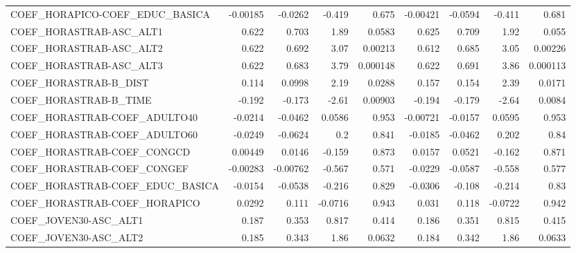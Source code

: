 \begin{tabular}{lrrrrrrrr}
COEF\_HORAPICO-COEF\_EDUC\_BASICA    &    -0.00185 &      -0.0262 &   -0.419 &    0.675 &   -0.00421 &     -0.0594 &       -0.411 &         0.681 \\
COEF\_HORASTRAB-ASC\_ALT1           &       0.622 &        0.703 &     1.89 &   0.0583 &      0.625 &       0.709 &         1.92 &         0.055 \\
COEF\_HORASTRAB-ASC\_ALT2           &       0.622 &        0.692 &     3.07 &  0.00213 &      0.612 &       0.685 &         3.05 &       0.00226 \\
COEF\_HORASTRAB-ASC\_ALT3           &       0.622 &        0.683 &     3.79 & 0.000148 &      0.622 &       0.691 &         3.86 &      0.000113 \\
COEF\_HORASTRAB-B\_DIST             &       0.114 &       0.0998 &     2.19 &   0.0288 &      0.157 &       0.154 &         2.39 &        0.0171 \\
COEF\_HORASTRAB-B\_TIME             &      -0.192 &       -0.173 &    -2.61 &  0.00903 &     -0.194 &      -0.179 &        -2.64 &        0.0084 \\
COEF\_HORASTRAB-COEF\_ADULTO40      &     -0.0214 &      -0.0462 &   0.0586 &    0.953 &   -0.00721 &     -0.0157 &       0.0595 &         0.953 \\
COEF\_HORASTRAB-COEF\_ADULTO60      &     -0.0249 &      -0.0624 &      0.2 &    0.841 &    -0.0185 &     -0.0462 &        0.202 &          0.84 \\
COEF\_HORASTRAB-COEF\_CONGCD        &     0.00449 &       0.0146 &   -0.159 &    0.873 &     0.0157 &      0.0521 &       -0.162 &         0.871 \\
COEF\_HORASTRAB-COEF\_CONGEF        &    -0.00283 &     -0.00762 &   -0.567 &    0.571 &    -0.0229 &     -0.0587 &       -0.558 &         0.577 \\
COEF\_HORASTRAB-COEF\_EDUC\_BASICA   &     -0.0154 &      -0.0538 &   -0.216 &    0.829 &    -0.0306 &      -0.108 &       -0.214 &          0.83 \\
COEF\_HORASTRAB-COEF\_HORAPICO      &      0.0292 &        0.111 &  -0.0716 &    0.943 &      0.031 &       0.118 &      -0.0722 &         0.942 \\
COEF\_JOVEN30-ASC\_ALT1             &       0.187 &        0.353 &    0.817 &    0.414 &      0.186 &       0.351 &        0.815 &         0.415 \\
COEF\_JOVEN30-ASC\_ALT2             &       0.185 &        0.343 &     1.86 &   0.0632 &      0.184 &       0.342 &         1.86 &        0.0633 \\

\end{tabular}
